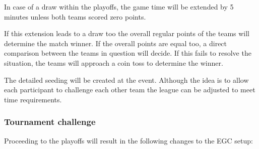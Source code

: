 \documentclass[12pt,twoside]{article}
\begin{document}
In case of a draw within the playoffs, the game time will be extended
by 5 minutes unless both teams scored zero points.

If this extension leads to a draw too the overall regular points of
the teams will determine the match winner. If the overall points are
equal too, a direct comparison between the teams in question will
decide. If this fails to resolve the situation, the teams will
approach a coin toss to determine the winner.

The detailed seeding will be created at the event. Although the idea
is to allow each participant to challenge each other team the league
can be adjusted to meet time requirements.


\subsubsection{Tournament challenge}
Proceeding to the playoffs will result in the following changes to the EGC setup:
\end{document}

